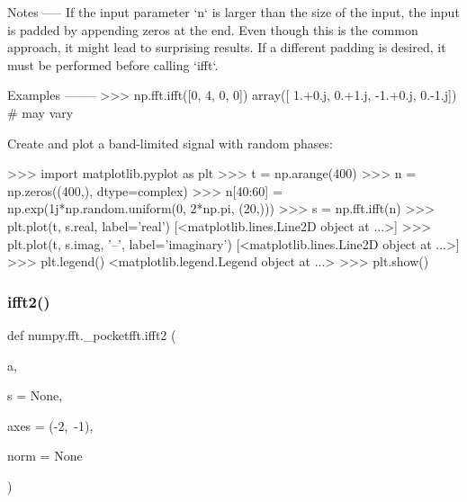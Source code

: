 \begin{DoxyVerb}
Notes
-----
If the input parameter `n` is larger than the size of the input, the input
is padded by appending zeros at the end.  Even though this is the common
approach, it might lead to surprising results.  If a different padding is
desired, it must be performed before calling `ifft`.

Examples
--------
>>> np.fft.ifft([0, 4, 0, 0])
array([ 1.+0.j,  0.+1.j, -1.+0.j,  0.-1.j]) # may vary

Create and plot a band-limited signal with random phases:

>>> import matplotlib.pyplot as plt
>>> t = np.arange(400)
>>> n = np.zeros((400,), dtype=complex)
>>> n[40:60] = np.exp(1j*np.random.uniform(0, 2*np.pi, (20,)))
>>> s = np.fft.ifft(n)
>>> plt.plot(t, s.real, label='real')
[<matplotlib.lines.Line2D object at ...>]
>>> plt.plot(t, s.imag, '--', label='imaginary')
[<matplotlib.lines.Line2D object at ...>]
>>> plt.legend()
<matplotlib.legend.Legend object at ...>
>>> plt.show()\end{DoxyVerb}
 \mbox{\label{namespacenumpy_1_1fft_1_1__pocketfft_aa91edeeab7af5c6fadaeafa34a8c37e6}} 
\subsubsection{\texorpdfstring{ifft2()}{ifft2()}}
{\footnotesize\ttfamily def numpy.\+fft.\+\_\+pocketfft.\+ifft2 (\begin{DoxyParamCaption}\item[{}]{a,  }\item[{}]{s = {\ttfamily None},  }\item[{}]{axes = {\ttfamily (-\/2,~-\/1)},  }\item[{}]{norm = {\ttfamily None} }\end{DoxyParamCaption})}

